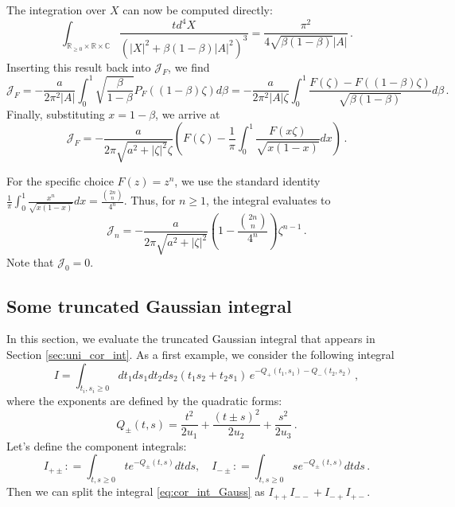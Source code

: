 \documentclass[11pt]{article}
\numberwithin{equation}{section}
\begin{document}
The integration over $X$ can now be computed directly:
\begin{equation}
\int_{\mathbb{R}_{\geq0}\times \mathbb{R}\times \mathbb{C}}\frac{td^4X}{(|X|^2+ \beta(1-\beta)|A|^2)^3}= \frac{\pi^2}{4\sqrt{\beta(1-\beta)}|A|}\,.
\end{equation}
Inserting this result back into $\mathcal{J}_F$, we find
\begin{equation}
\mathcal{J}_F = -\frac{a}{2\pi^2|A|}\int_0^1\sqrt{\frac{\beta}{1-\beta}}P_F((1-\beta)\zeta)d\beta = -\frac{a}{2\pi^2|A|\zeta}\int_0^1 \frac{F(\zeta)-F((1-\beta)\zeta)}{\sqrt{\beta(1-\beta)}}d\beta \,.
\end{equation}
Finally, substituting $x=1-\beta$, we arrive at
\begin{equation}
\mathcal{J}_F = -\frac{a}{2\pi \sqrt{a^2+|\zeta|^2}\zeta}\left(F(\zeta)-\frac1\pi\int_0^1\frac{F(x\zeta)}{\sqrt{x(1-x)}}dx\right)\,.
\end{equation}

For the specific choice \(F(z)=z^n\), we use the standard identity $ \frac1\pi \int_0^1\frac{x^n}{\sqrt{x(1-x)}} dx = \frac{\binom{2n}{n}}{4^n}$. Thus, for \(n\geq1\), the integral evaluates to
\begin{equation}
\mathcal{J}_n = -\frac{a}{2\pi \sqrt{a^2+|\zeta|^2} }\left( 1-\frac{\binom{2n}{n}}{4^n}\right)\zeta^{n-1}\,.
\end{equation}
Note that $\mathcal{J}_0=0$.

\subsection{Some truncated Gaussian integral}
\label{sec:truncated_Gauss}
In this section, we evaluate the truncated Gaussian integral that appears in Section \ref{sec:uni_cor_int}. As a first example, we consider the following integral
\begin{equation}\label{eq:cor_int_Gauss}
I = \int_{t_i,s_i \geq 0} dt_1 ds_1 dt_2 ds_2 (t_1 s_2 + t_2 s_1) \, e^{-Q_+(t_1, s_1) -Q_-(t_2, s_2)} \,,
\end{equation}
where the exponents are defined by the quadratic forms:
\begin{equation}
		Q_{\pm}(t, s) = \frac{t^2}{2u_1} + \frac{(t\pm s)^2}{2u_2} + \frac{s^2}{2u_3}\,.
\end{equation}
Let's define the component integrals:
\begin{equation}
	I_{+\pm} : = \int_{t,s\geq 0}  te^{-Q_{\pm}(t,s)}dtds,\quad I_{-\pm} : = \int_{t,s\geq 0}  se^{-Q_{\pm}(t,s)}dtds\,.
\end{equation}
Then we can split the integral \eqref{eq:cor_int_Gauss} as $I_{++} I_{--} + I_{-+} I_{+-}$.
\end{document}

